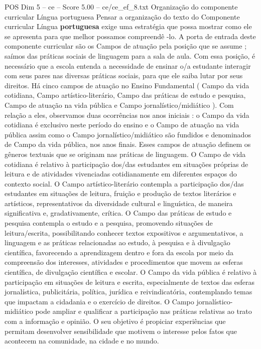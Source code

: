 \begin{textsample}{POS Dim 5 – ce – Score 5.00 – ce/ce\_ef\_8.txt}  \label{ex:f5_pos_255}
Organização do componente curricular Língua portuguesa Pensar a organização do texto do Componente curricular Língua \textbf{portuguesa} exige uma estratégia que possa mostrar como ele se apresenta para que melhor possamos compreendê -lo.
A porta de entrada deste componente curricular são os Campos de atuação pela posição que se assume ; saímos das práticas sociais de linguagem para a sala de aula.
Com essa posição, é necessário que a escola entenda a necessidade de ensinar o/a estudante interagir com seus pares nas diversas práticas sociais, para que ele saiba lutar por seus direitos.
Há cinco campos de atuação no Ensino Fundamental ( Campo da vida cotidiana, Campo artístico-literário, Campo das práticas de estudo e pesquisa, Campo de atuação na vida pública e Campo jornalístico/midiático ).
Com relação a eles, observamos duas ocorrências nos anos iniciais : o Campo da vida cotidiana é exclusivo neste período do ensino e o Campo de atuação na vida pública assim como o Campo jornalístico/midiático são fundidos e denominados de Campo da vida pública, nos anos finais.
Esses campos de atuação definem os gêneros textuais que se originam nas práticas de linguagem.
O Campo de vida cotidiana é relativo à participação dos/das estudantes em situações próprias de leitura e de atividades vivenciadas cotidianamente em diferentes espaços do contexto social.
O Campo artístico-literário contempla a participação dos/das estudantes em situações de leitura, fruição e produção de textos literários e artísticos, representativos da diversidade cultural e linguística, de maneira significativa e, gradativamente, crítica.
O Campo das práticas de estudo e pesquisa contempla o estudo e a pesquisa, promovendo situações de leitura/escrita, possibilitando conhecer textos expositivos e argumentativos, a linguagem e as práticas relacionadas ao estudo, à pesquisa e à divulgação científica, favorecendo a aprendizagem dentro e fora da escola por meio da compreensão dos interesses, atividades e procedimentos que movem as esferas científica, de divulgação científica e escolar.
O Campo da vida pública é relativo à participação em situações de leitura e escrita, especialmente de textos das esferas jornalística, publicitária, política, jurídica e reivindicatória, contemplando temas que impactam a cidadania e o exercício de direitos.
O Campo jornalístico-midiático pode ampliar e qualificar a participação nas práticas relativas ao trato com a informação e opinião.
O seu objetivo é propiciar experiências que permitam desenvolver sensibilidade que motivem o interesse pelos fatos que acontecem na comunidade, na cidade e no mundo.

\end{textsample}
